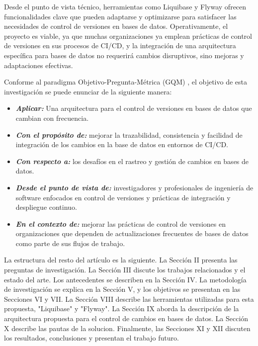 \documentclass{IEEEtran}
\begin{document}
Desde el punto de vista técnico, herramientas como Liquibase y Flyway ofrecen funcionalidades clave que pueden adaptarse y optimizarse para satisfacer las necesidades de control de versiones en bases de datos. Operativamente, el proyecto es viable, ya que muchas organizaciones ya emplean prácticas de control de versiones en sus procesos de CI/CD, y la integración de una arquitectura específica para bases de datos no requerirá cambios disruptivos, sino mejoras y adaptaciones efectivas.

Conforme al paradigma Objetivo-Pregunta-Métrica (GQM) \cite{Basili1992}, el objetivo de esta investigación se puede enunciar de la siguiente manera:

\begin{itemize}
    \item[] {\textbf{\textit{Aplicar:}}} Una arquitectura para el control de versiones en bases de datos que cambian con frecuencia.
    \item[] {\textbf{\textit{Con el propósito de:}}} mejorar la trazabilidad, consistencia y facilidad de integración de los cambios en la base de datos en entornos de CI/CD.
    \item[] {\textbf{\textit{Con respecto a:}}} los desafíos en el rastreo y gestión de cambios en bases de datos.
    \item[] {\textbf{\textit{Desde el punto de vista de:}}} investigadores y profesionales de ingeniería de software enfocados en control de versiones y prácticas de integración y despliegue continuo.
    \item[] {\textbf{\textit{En el contexto de:}}} mejorar las prácticas de control de versiones en organizaciones que dependen de actualizaciones frecuentes de bases de datos como parte de sus flujos de trabajo.
\end{itemize}


\vspace{0.5cm}
La estructura del resto del artículo es la siguiente. La Sección II presenta las preguntas de investigación. La Sección III discute los trabajos relacionados y el estado del arte. Los antecedentes se describen en la Sección IV. La metodología de investigación se explica en la Sección V, y los objetivos se presentan en las Secciones VI y VII. La Sección VIII describe las herramientas utilizadas para esta propuesta, "Liquibase" y "Flyway". La Sección IX aborda la descripción de la arquitectura propuesta para el control de cambios en bases de datos. La Sección X describe las pautas de la solucion. Finalmente, las Secciones XI y XII discuten los resultados, conclusiones y presentan el trabajo futuro.
\end{document}
